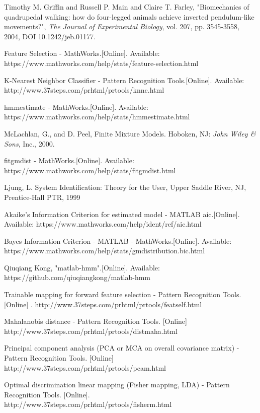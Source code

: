 \begin{thebibliography}{5}
 Timothy M. Griffin and Russell P. Main and Claire T. Farley, "Biomechanics of quadrupedal walking: how do four-legged animals achieve
inverted pendulum-like movements?", \emph{The Journal of Experimental Biology}, vol. 207, pp. 3545-3558, 2004, DOI 10.1242/jeb.01177.

 Feature Selection - MathWorks.[Online]. Available: https://www.mathworks.com/help/stats/feature-selection.html

 K-Nearest Neighbor Classifier - Pattern Recognition Tools.[Online]. Available: http://www.37steps.com/prhtml/prtools/knnc.html

 hmmestimate - MathWorks.[Online]. Available: https://www.mathworks.com/help/stats/hmmestimate.html

 McLachlan, G., and D. Peel, Finite Mixture Models. Hoboken, NJ: \emph{John Wiley \& Sons}, Inc., 2000.

 fitgmdist - MathWorks.[Online]. Available:  https://www.mathworks.com/help/stats/fitgmdist.html

 Ljung, L. System Identification: Theory for the User, Upper Saddle River, NJ, Prentice-Hall PTR, 1999

 Akaike's Information Criterion for estimated model - MATLAB aic.[Online]. Available:  https://www.mathworks.com/help/ident/ref/aic.html

 Bayes Information Criterion - MATLAB - MathWorks.[Online]. Available: https://www.mathworks.com/help/stats/gmdistribution.bic.html

 Qiuqiang Kong, "matlab-hmm".[Online]. Available: https://github.com/qiuqiangkong/matlab-hmm

 Trainable mapping for forward feature selection - Pattern Recognition Tools. [Online] . http://www.37steps.com/prhtml/prtools/featself.html

 Mahalanobis distance - Pattern Recognition Tools. [Online] http://www.37steps.com/prhtml/prtools/distmaha.html

 Principal component analysis (PCA or MCA on overall covariance matrix) - Pattern Recognition Tools. [Online] http://www.37steps.com/prhtml/prtools/pcam.html

 Optimal discrimination linear mapping (Fisher mapping, LDA) - Pattern Recognition Tools. [Online]. http://www.37steps.com/prhtml/prtools/fisherm.html


\end{thebibliography}
